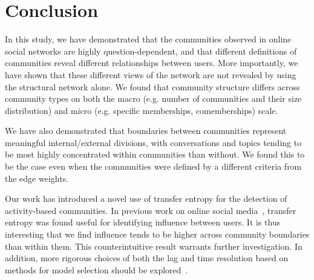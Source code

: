 \documentclass[letterpaper]{article}
\begin{document}
\section{Conclusion}


In this study, we have demonstrated that the communities observed in online social networks are highly question-dependent, and that different definitions of communities reveal different relationships between users. More importantly, we have shown that these different views of the network are not revealed by using the structural network alone. We found that community structure differs across community types on both the macro (e.g. number of communities and their size distribution) and micro (e.g. specific memberships, comemberships) scale.

We have also demonstrated that boundaries between communities represent meaningful internal/external divisions, with conversations and topics tending to be most highly concentrated within communities than without. We found this to be the case even when the communities were defined by a different criteria from the edge weights.







Our work has introduced a novel use of transfer entropy for the detection of activity-based communities. In previous work on online social media~\cite{ver2012information}, transfer entropy was found useful for identifying influence between users. It is thus interesting that we find influence tends to be higher across community boundaries than within them. This counterintuitive result warrants further investigation. In addition, more rigorous choices of both the lag and time resolution based on methods for model selection should be explored~\cite{claeskens2008model}.
\end{document}

